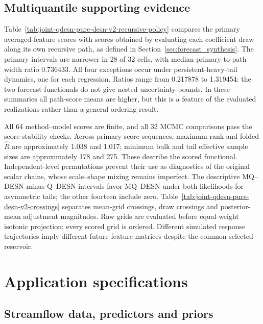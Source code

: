 \documentclass[12pt,letterpaper]{article}
\numberwithin{suppalgorithm}{section}
\numberwithin{equation}{section}
\numberwithin{table}{section}
\numberwithin{figure}{section}
\begin{document}


\subsection{Multiquantile supporting evidence}

Table~\ref{tab:joint-qdesn-pure-desn-v2-recursive-policy} compares the
primary averaged-feature scores with scores obtained by evaluating each
coefficient draw along its own recursive path, as defined in
Section~\ref{sec:forecast_synthesis}. The primary intervals are narrower
in 28 of 32 cells, with median primary-to-path width ratio 0.736433.
All four exceptions occur under persistent-heavy-tail dynamics, one for
each regression. Ratios range from 0.217878 to 1.319454: the two forecast
functionals do not give nested uncertainty bounds. In these summaries all
path-score means are higher, but this is a feature of the evaluated
realizations rather than a general ordering result.



All 64 method--model scores are finite, and all 32 MCMC comparisons pass
the score-stability checks. Across primary score sequences,
maximum rank and folded \(\widehat R\) are approximately 1.038 and 1.017;
minimum bulk and tail effective sample sizes are approximately 178 and
275. These describe the scored functional. Independent-level permutations
prevent their use as diagnostics of the original scalar chains, whose
scale--shape mixing remains imperfect.
The descriptive MQ--DESN-minus-Q--DESN intervals favor MQ--DESN under
both likelihoods for asymmetric tails; the other fourteen include zero.
Table~\ref{tab:joint-qdesn-pure-desn-v2-crossings} separates mean-grid
crossings, draw crossings and posterior-mean adjustment magnitudes.
Raw grids are evaluated before equal-weight isotonic projection; every
scored grid is ordered. Different simulated response trajectories imply
different future feature matrices despite the common selected reservoir.



\clearpage
\section{Application specifications}
\label{sec:appendix-applications}

\subsection{Streamflow data, predictors and priors}
\label{sec:glofas_discrepancy}
\label{subsec:glofas_aug_design}
\end{document}
